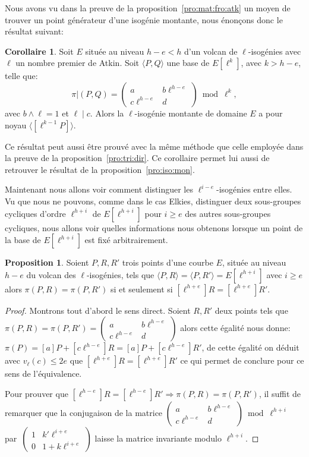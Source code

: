 \documentclass[10pt,a4paper]{book}
\theoremstyle{plain}
\theoremstyle{definition}
\theoremstyle{definition}
\theoremstyle{definition}
\newtheorem{cor}[thm]{Corollaire}
\theoremstyle{definition}
\newtheorem{prop}[thm]{Proposition}
\theoremstyle{definition}
\theoremstyle{remark}
\theoremstyle{remark}
\theoremstyle{definition}
\begin{document}
Nous avons vu dans la preuve de la proposition~\ref{pro:mat:fro:atk} un moyen 
de trouver un point générateur d'une isogénie montante, nous énonçons donc le 
résultat suivant:
\begin{cor}
\label{cor:mon:atk}
Soit $E$ située au niveau $h-e < h$ d'un volcan de $\ell$-isogénies avec 
$\ell$ un nombre premier de Atkin. Soit $\langle P,Q \rangle$ une base de $E[\ell^k]$,
avec $k>h-e$, telle que:
\[
\pi|(P,Q)=\left ( \begin{matrix}a & b\ell^{h-e} \\ c\ell^{h-e} & d
\end{matrix}\right ) \bmod \ell^k, 
\] 
avec $b \wedge \ell=1$ et $\ell \mid c$. Alors la $\ell$-isogénie montante de domaine
$E$ a pour noyau $\langle [\ell^{k-1}P] \rangle$.
\end{cor}
Ce résultat peut aussi être prouvé avec la même méthode que celle employée dans
la preuve de la proposition~\ref{pro:tri:dir}. Ce corollaire permet lui aussi 
de retrouver le résultat de la proposition~\ref{pro:iso:mon}.

Maintenant nous allons voir comment distinguer les
$\ell^{i-e}$-isogénies entre elles. Vu que nous ne pouvons, comme dans le 
cas Elkies, distinguer deux sous-groupes cycliques d'ordre $\ell^{h+i}$ de 
$E[\ell^{h+i}]$ pour $i \geqslant e$ des autres sous-groupes cycliques, nous 
allons voir quelles informations nous obtenons lorsque un point de la base de 
$E[\ell^{h+i}]$ est fixé arbitrairement.

\begin{prop}
\label{pro:atk:equi}
Soient $P,R,R'$ trois points d'une courbe $E$, située au niveau $h-e$ du volcan
des $\ell$-isogénies, tels que $\langle P,R \rangle = \langle P,R' \rangle= 
E[\ell^{h+i}]$ avec $i \geqslant e$ alors $\pi(P,R)=\pi(P,R') $ si et seulement
si $[\ell^{h+e}]R=[\ell^{h+e}]R'$.
\end{prop}

\begin{proof}
Montrons tout d'abord le sens direct.
Soient $R,R'$ deux points tels que $\pi(P,R)=\pi(P,R')=\left ( 
\begin{smallmatrix}a & b\ell^{h-e}\\c\ell^{h-e} & d \end{smallmatrix}\right )$ 
alors cette égalité nous donne:
 $\pi(P)=[a]P+[c\ell^{h-e}]R=[a]P+[c\ell^{h-e}]R'$, de
cette égalité on déduit avec $v_{\ell}(c) \leqslant 2e$ que $[\ell^{h+e}]R=
[\ell^{h+e}]R'$ ce qui permet de conclure pour ce sens de l'équivalence.

Pour prouver que $[\ell^{h-e}]R=[\ell^{h-e}]R' \Rightarrow 
\pi(P,R)=\pi(P,R')$, il suffit de remarquer que la conjugaison de la 
matrice $\left ( \begin{smallmatrix}a & b\ell^{h-e}\\c\ell^{h-e} & d
\end{smallmatrix}\right ) \bmod \ell^{h+i}$ par~$\left ( \begin{smallmatrix}1
& k' \ell^{i+e} \\ 0 & 1 + k \ell^{i+e} \end{smallmatrix} \right )$  laisse la matrice invariante 
modulo $\ell^{h+i}$.
\end{proof}
\end{document}
